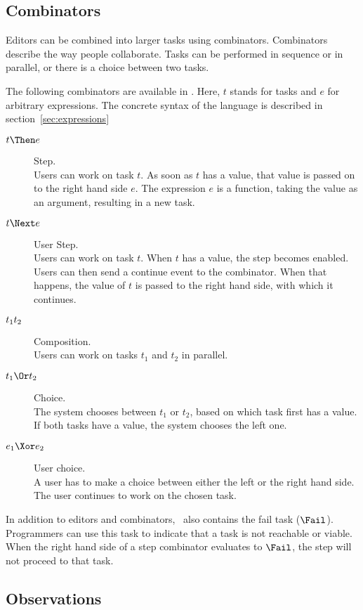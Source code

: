 \subsection{Combinators}

Editors can be combined into larger tasks using combinators.
Combinators describe the way people collaborate.
Tasks can be performed in sequence or in parallel, or there is a choice between two tasks.

The following combinators are available in \TOPHAT.
Here, $t$ stands for tasks and $e$ for arbitrary expressions.
The concrete syntax of the language is described in section~\ref{sec:expressions}
\begin{description}
  \item[$t \Then e$] Step.\\
    Users can work on task $t$.
    As soon as $t$ has a value, that value is passed on to the right hand side $e$.
    The expression $e$ is a function, taking the value as an argument, resulting in a new task.
  \item[$t \Next e$] User Step.\\
    Users can work on task $t$.
    When $t$ has a value, the step becomes enabled.
    Users can then send a continue event to the combinator.
    When that happens, the value of $t$ is passed to the right hand side, with which it continues.
  \item[$t_1 \relax t_2$] Composition.\\
    Users can work on tasks $t_1$ and $t_2$ in parallel.
  \item[$t_1 \Or t_2$] Choice.\\
    The system chooses between $t_1$ or $t_2$,
    based on which task first has a value.
    If both tasks have a value, the system chooses the left one.
  \item[$e_1 \Xor e_2$] User choice.\\
    A user has to make a choice between either the left or the right hand side.
    The user continues to work on the chosen task.
\end{description}

In addition to editors and combinators, \TOPHAT\ also contains the fail task ($\Fail$).
Programmers can use this task to indicate that a task is not reachable or viable.
When the right hand side of a step combinator evaluates to $\Fail$, the step will not proceed to that task.



\subsection{Observations}

